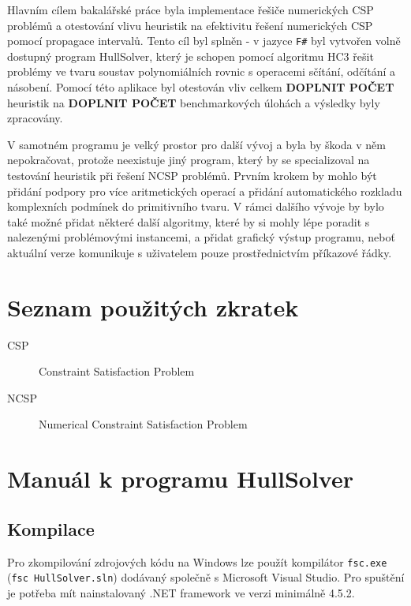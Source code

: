 \documentclass[thesis=B,czech]{FITthesis}[2012/06/26]
\theoremstyle{definition}
\begin{document}
\begin{conclusion}
Hlavním cílem bakalářské práce byla implementace řešiče numerických CSP problémů a otestování vlivu heuristik na efektivitu řešení numerických CSP pomocí propagace intervalů. Tento cíl byl splněn - v jazyce \texttt{F\#} byl vytvořen volně dostupný program HullSolver, který je schopen pomocí algoritmu HC3 řešit problémy ve tvaru soustav polynomiálních rovnic s operacemi sčítání, odčítání a násobení. Pomocí této aplikace byl otestován vliv celkem \textbf{DOPLNIT POČET} heuristik na \textbf{DOPLNIT POČET} benchmarkových úlohách a výsledky byly zpracovány.

V samotném programu je velký prostor pro další vývoj a byla by škoda v něm nepokračovat, protože neexistuje jiný program, který by se specializoval na testování heuristik při řešení NCSP problémů. Prvním krokem by mohlo být přidání podpory pro více aritmetických operací a přidání automatického rozkladu komplexních podmínek do primitivního tvaru. V rámci dalšího vývoje by bylo také možné přidat některé další algoritmy, které by si mohly lépe poradit s nalezenými problémovými instancemi, a přidat grafický výstup programu, neboť aktuální verze komunikuje s uživatelem pouze prostřednictvím příkazové řádky.




\end{conclusion}




\appendix

\chapter{Seznam použitých zkratek}
\begin{description}
	\item[CSP] Constraint Satisfaction Problem
	\item[NCSP] Numerical Constraint Satisfaction Problem
\end{description}



\chapter{Manuál k programu HullSolver}
\label{hullSolverManual}
\section{Kompilace}
Pro zkompilování zdrojových kódu na Windows lze použít kompilátor \verb|fsc.exe| (\verb|fsc HullSolver.sln|) dodávaný společně s Microsoft Visual Studio. Pro spuštění je potřeba mít nainstalovaný .NET framework ve verzi minimálně 4.5.2.
\end{document}
